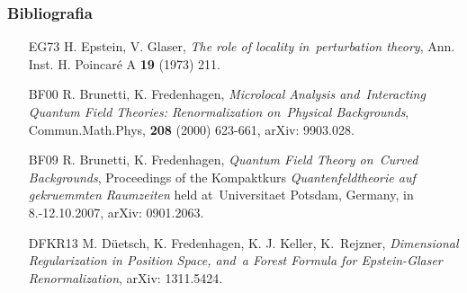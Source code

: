 \documentclass[10pt,t]{beamer}
\begin{document}
\begin{frame}
  \frametitle{Bibliografia}


  \begin{itemize}
    \RaggedRight

  \item [EG73] H. Epstein, V. Glaser, \textit{The role of locality
      in~perturbation theory}, Ann. Inst. H. Poincar\'{e} A
    \textbf{19} (1973) 211.

  \item [BF00] R. Brunetti, K. Fredenhagen, \textit{Microlocal Analysis
    and~Interacting Quantum Field Theories: Renormalization
    on~Physical Backgrounds}, Commun.Math.Phys, \textbf{208} (2000)
    623-661, arXiv: 9903.028.

  \item [BF09] R. Brunetti, K. Fredenhagen, \textit{Quantum Field
      Theory on~Curved Backgrounds}, Proceedings of the
    Kompaktkurs \textit{Quantenfeldtheorie auf gekruemmten Raumzeiten} held
    at~Universitaet Potsdam, Germany, in 8.-12.10.2007, arXiv:
    0901.2063.

  \item [DFKR13] M. D\"{u}etsch, K. Fredenhagen, K. J. Keller,
    K.~Rejzner, \textit{Dimensional Regularization in Position Space,
      and~a Forest Formula for Epstein-Glaser Renormalization}, arXiv:
    1311.5424.

  \end{itemize}

\end{frame}












{}






\end{document}
